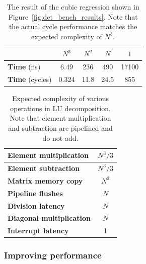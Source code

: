 \documentclass[]{article}
\begin{document}
\begin{table}[tbp]
	\caption{The result of the cubic regression shown in Figure~\ref{fig:det_bench_results}. Note that the actual cycle performance matches the expected complexity of $N^3$.}
	\label{tab:polyfit_coeffs}
	\begin{center}
		\begin{tabular}{l|cccc}
		\hline

		\hline
			& \textbf{$N^3$} & \textbf{$N^2$} & \textbf{$N$} & \textbf{$1$}\\
		\hline
			\textbf{Time} (ns)
			& 6.49 	& 236	& 490	& 17100 \\
			\textbf{Time} (cycles)
			& 0.324 & 11.8 	& 24.5 	& 855 \\
		\hline

		\hline
		\end{tabular}
	\end{center}
\end{table}



\begin{table}[tbp]
	\caption{Expected complexity of various operations in LU decomposition. Note that element multiplication and subtraction are pipelined and do not add.}
	\label{tab:expected_complexity}
	\begin{center}
		\begin{tabular}{l|c}
		\hline

		\hline
			\textbf{Element multiplication} 	& $N^3/3$ \\
		\hline
			\textbf{Element subtraction} 		& $N^3/3$ \\
		\hline
			\textbf{Matrix memory copy} 		& $N^2$ \\
		\hline
			\textbf{Pipeline flushes} 			& $N$ \\
		\hline
			\textbf{Division latency} 			& $N$ \\
		\hline
			\textbf{Diagonal multiplication} 	& $N$ \\
		\hline
			\textbf{Interrupt latency}			& 1 \\
		\hline
		
		\hline
		\end{tabular}
	\end{center}
\end{table}


\subsubsection{Improving performance} %
\label{sub:improving_performance}
\end{document}
